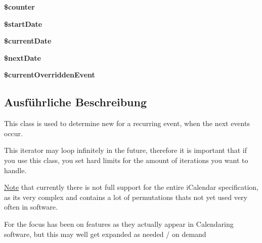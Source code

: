\begin{DoxyCompactItemize}
{\bfseries \$counter}
\item 
\mbox{\label{class_sabre_1_1_v_object_1_1_recur_1_1_event_iterator_ac80f415d458e4ef084f58c7b79e9a747}} 
{\bfseries \$start\+Date}
\item 
\mbox{\label{class_sabre_1_1_v_object_1_1_recur_1_1_event_iterator_ab4f7c80fef14ced72c6dc1e28f0a5a40}} 
{\bfseries \$current\+Date}
\item 
\mbox{\label{class_sabre_1_1_v_object_1_1_recur_1_1_event_iterator_ae08c258c616d5d56db4267b922407cf7}} 
{\bfseries \$next\+Date}
\item 
\mbox{\label{class_sabre_1_1_v_object_1_1_recur_1_1_event_iterator_ad7379f21badc6544271e82de041f909e}} 
{\bfseries \$current\+Overridden\+Event}
\end{DoxyCompactItemize}


\subsection{Ausführliche Beschreibung}
This class is used to determine new for a recurring event, when the next events occur.

This iterator may loop infinitely in the future, therefore it is important that if you use this class, you set hard limits for the amount of iterations you want to handle.

\mbox{\hyperlink{class_note}{Note}} that currently there is not full support for the entire i\+Calendar specification, as it\textquotesingle{}s very complex and contains a lot of permutations that\textquotesingle{}s not yet used very often in software.

For the focus has been on features as they actually appear in Calendaring software, but this may well get expanded as needed / on demand

